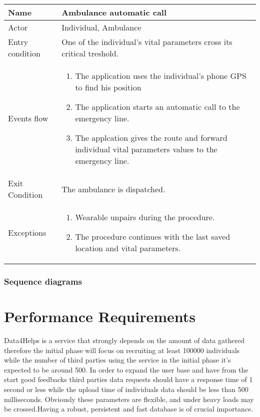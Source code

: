 \begin{tabular}{|l|p{13cm}|}
    \hline
    Name & Ambulance automatic call
    \\ \hline
    Actor & Individual, Ambulance
    \\ \hline 
    Entry condition & One of the individual's vital parameters cross its critical treshold.
        \\ \hline
    Events flow &
    \begin{enumerate}
    \item The application uses the individual's phone GPS to find his position
	\item The application starts an automatic call to the emergency line.
	\item The applcation gives the route and forward individual vital parameters values to the emergency line.
    \end{enumerate}
     \\ \hline
     Exit Condition & The ambulance is dispatched.
     \\
    \hline
    Exceptions &
        \begin{enumerate}
    \item Wearable unpairs during the procedure.
    \item The procedure continues with the last saved location and vital parameters.
    \end{enumerate}
      \\
\end{tabular}





\subsubsection{Sequence diagrams}

\section{Performance Requirements}
Data4Helps is a service that strongly depends on the amount of data gathered therefore the initial phase will focus on recruiting at least 100000 individuals while the number of third parties using the service in the initial phase it's expected to be around 500. In order to expand the user base and have from the start good feedbacks third parties data requests should have a response time of 1 second or less while the upload time of individuals data should be less than 500 milliseconds. Obviously these parameters are flexible, and under heavy loads may be crossed.Having a robust, persistent and fast database is of crucial importance.

